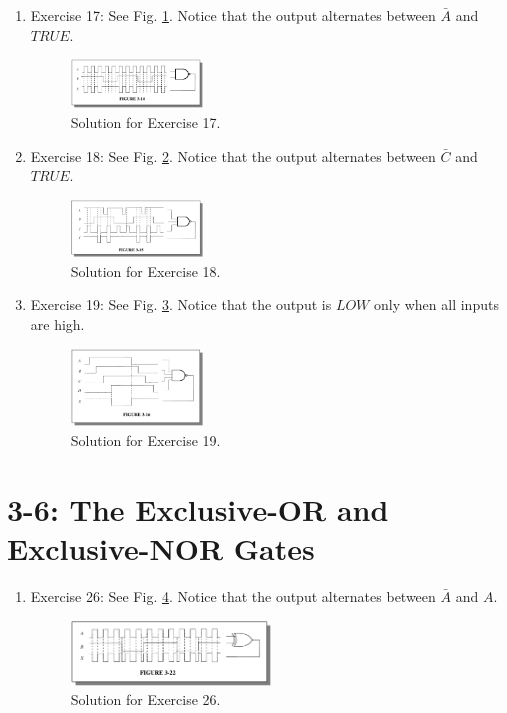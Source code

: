 \documentclass[10pt]{article}
\begin{document}
\begin{enumerate}
\item Exercise 17: See Fig. \ref{fig:nand1}.  Notice that the output alternates between $\bar{A}$ and $TRUE$.
\begin{figure}[h!]
\centering
\includegraphics[width=0.33\textwidth]{figures/nand1.png}
\caption{\label{fig:nand1} Solution for Exercise 17.}
\end{figure}
\clearpage
\item Exercise 18: See Fig. \ref{fig:nand2}.  Notice that the output alternates between $\bar{C}$ and $TRUE$.
\begin{figure}[ht]
\centering
\includegraphics[width=0.33\textwidth]{figures/nand2.png}
\caption{\label{fig:nand2} Solution for Exercise 18.}
\end{figure}
\item Exercise 19: See Fig. \ref{fig:nand3}.  Notice that the output is $LOW$ only when all inputs are high.
\begin{figure}[ht]
\centering
\includegraphics[width=0.33\textwidth]{figures/nand3.png}
\caption{\label{fig:nand3} Solution for Exercise 19.}
\end{figure}
\end{enumerate}

\section{3-6: The Exclusive-OR and Exclusive-NOR Gates}

\begin{enumerate}
\item Exercise 26: See Fig. \ref{fig:xor1}.  Notice that the output alternates between $\bar{A}$ and $A$.
\begin{figure}[ht]
\centering
\includegraphics[width=0.5\textwidth]{figures/xor1.png}
\caption{\label{fig:xor1} Solution for Exercise 26.}
\end{figure}
\end{enumerate}
\end{document}
